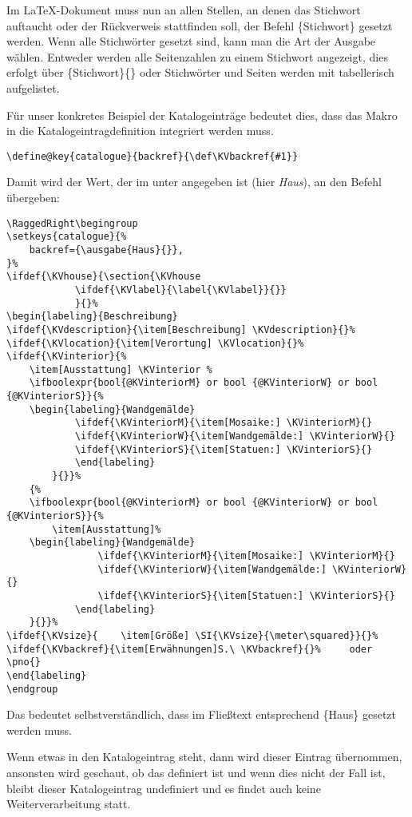 \documentclass[ngerman]{dtk}
\makeatletter
\newcommand\catalogueentry[1]{%
\RaggedRight\begingroup
\setkeys{catalogue}{#1}%
\ifdef{\KVhouse}{\section{\KVhouse
			\ifdef{\KVlabel}{\label{\KVlabel}}{}}
			}{}%
\begin{labeling}{Beschreibung}
\ifdef{\KVdescription}{\item[Beschreibung] \KVdescription}{}%
\ifdef{\KVlocation}{\item[Verortung] \KVlocation}{}%
\ifdef{\KVinterior}{%
	\item[Ausstattung] \KVinterior %
	\ifboolexpr{bool{@KVinteriorM} or bool {@KVinteriorW} or bool {@KVinteriorS}}{%
	\begin{labeling}{Wandgemälde}
			\ifdef{\KVinteriorM}{\item[Mosaike:] \KVinteriorM}{}
			\ifdef{\KVinteriorW}{\item[Wandgemälde:] \KVinteriorW}{}
			\ifdef{\KVinteriorS}{\item[Statuen:] \KVinteriorS}{}
			\end{labeling}
		}{}}%
	{%
	\ifboolexpr{bool{@KVinteriorM} or bool {@KVinteriorW} or bool {@KVinteriorS}}{%
		\item[Ausstattung]%
	\begin{labeling}{Wandgemälde}	
				\ifdef{\KVinteriorM}{\item[Mosaike:] \KVinteriorM}{}
				\ifdef{\KVinteriorW}{\item[Wandgemälde:] \KVinteriorW}{}
				\ifdef{\KVinteriorS}{\item[Statuen:] \KVinteriorS}{}
			\end{labeling}
	}{}}%
\ifdef{\KVsize}{	\item[Größe] \SI{\KVsize}{\meter\squared}}{}%
\ifdef{\KVbackref}{\item[Erwähnungen]S.\ \KVbackref}{}%
\end{labeling}
\endgroup
}
\newcommand{\ausgabe}[2]{#2}
\makeatother
\begin{document}
Im \LaTeX-Dokument muss nun an allen Stellen, an denen das Stichwort auftaucht oder der Rückverweis stattfinden soll,
der Befehl  \{Stichwort\} gesetzt werden.
Wenn alle Stichwörter gesetzt sind, kann man die Art der Ausgabe wählen.
Entweder werden alle Seitenzahlen zu einem Stichwort angezeigt, dies erfolgt über \{Stichwort\}\{\}
oder Stichwörter und Seiten werden mit   tabellerisch aufgelistet.

Für unser konkretes Beispiel der Katalogeinträge bedeutet dies, dass das Makro  in die Katalogeintragdefinition integriert werden muss.
\begin{lstlisting}[style=number]
\define@key{catalogue}{backref}{\def\KVbackref{#1}}
\end{lstlisting}
Damit wird der Wert, der im  unter  angegeben ist (hier \emph{Haus}), an den Befehl  übergeben:
\begin{lstlisting}[style=number]
\catalogueentry{%
	backref={\ausgabe{Haus}{}},
}
\end{lstlisting}
Das bedeutet selbstverständlich, dass im Fließtext entsprechend \{Haus\} gesetzt werden muss.

Wenn etwas in den Katalogeintrag  steht, dann wird dieser Eintrag übernommen,
ansonsten wird geschaut, ob das  definiert ist und wenn dies nicht der Fall ist, bleibt dieser Katalogeintrag undefiniert und es findet auch keine Weiterverarbeitung statt. 
\end{document}
